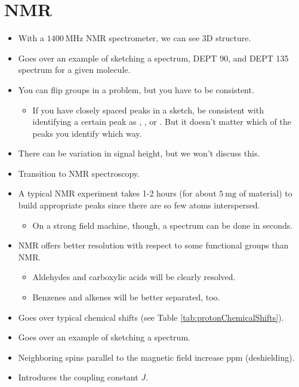 \documentclass[../notes.tex]{subfiles}
\begin{document}
\section{NMR}
\begin{itemize}
    \item {}With a $\SI{1400}{\mega\hertz}$ NMR spectrometer, we can see 3D structure.
    \item Goes over an example of sketching a  spectrum, DEPT 90, and DEPT 135 spectrum for a given molecule.
    \item You can flip groups in a problem, but you have to be consistent.
    \begin{itemize}
        \item If you have closely spaced peaks in a sketch, be consistent with identifying a certain peak as , , or . But it doesn't matter which of the peaks you identify which way.
    \end{itemize}
    \item There can be variation in signal height, but we won't discuss this.
    \item Transition to  NMR spectroscopy.
    \item A typical  NMR experiment takes 1-2 hours (for about $\SI{5}{\milli\gram}$ of material) to build appropriate peaks since there are so few  atoms interspersed.
    \begin{itemize}
        \item On a strong field machine, though, a  spectrum can be done in seconds.
    \end{itemize}
    \item {} NMR offers better resolution with respect to some functional groups than  NMR.
    \begin{itemize}
        \item Aldehydes and carboxylic acids will be clearly resolved.
        \item Benzenes and alkenes will be better separated, too.
    \end{itemize}
    \item Goes over typical chemical shifts (see Table \ref{tab:protonChemicalShifts}).
    \item Goes over an example of sketching a  spectrum.
    \item Neighboring spins parallel to the magnetic field increase ppm (deshielding).
    \item Introduces the coupling constant $J$.

\end{itemize}
\end{document}
